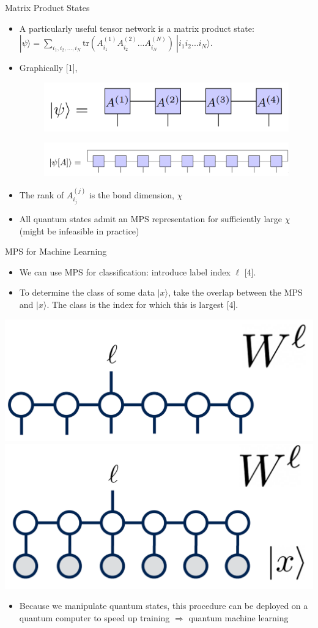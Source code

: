 \documentclass[llpt]{beamer}
\begin{document}
\begin{frame}{Matrix Product States}
  \begin{itemize}
      \item A particularly useful tensor network is a matrix product state: $|\psi \rangle = \sum_{i_1, i_2, ..., i_N} \text{tr}(A^{(1)}_{i_1} A^{(2)}_{i_2} ... A^{(N)}_{i_N})\ |i_1 i_2... i_N \rangle $.
      \item Graphically [1], 
      \begin{figure}
      \includegraphics[width=.5\textwidth]{MPS.PNG}
      \end{figure}
      \begin{figure}
      \includegraphics[width=.9\textwidth]{MPS_periodic.PNG}
      \end{figure} 
      \item The rank of $A^{(j)}_{i_j}$ is the bond dimension, $\chi$
      \item All quantum states admit an MPS representation for sufficiently large $\chi$ (might be infeasible in practice)
  \end{itemize}
\end{frame}


\begin{frame}{MPS for Machine Learning}
\begin{itemize}
    \item We can use MPS for classification: introduce label index $\ell$ [4].
    \item To determine the class of some data $|x \rangle$, take the overlap between the MPS and $ |x \rangle $. The class is the index for which this is largest [4]. 
\end{itemize}
\qquad \qquad
\includegraphics[width=.3\textwidth]{MPS_classification.PNG} \qquad
\includegraphics[width=.3\textwidth]{overlap.png}
\begin{itemize}
    \item Because we manipulate quantum states, this procedure can be deployed on a quantum computer to speed up training $\Rightarrow$ quantum machine learning
\end{itemize}
\end{frame}
\end{document}
